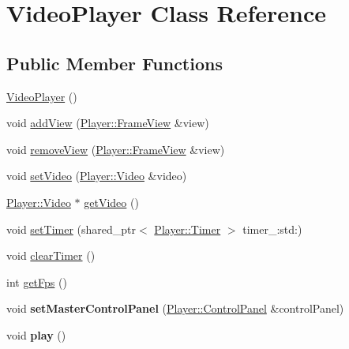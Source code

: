 \hypertarget{classPlayer_1_1VideoPlayer}{}\section{Video\+Player Class Reference}
\label{classPlayer_1_1VideoPlayer}
\subsection*{Public Member Functions}
\begin{DoxyCompactItemize}
\item 
\hyperlink{classPlayer_1_1VideoPlayer_af6d7bb082887f6a9738741778c58daf8}{Video\+Player} ()
\item 
void \hyperlink{classPlayer_1_1VideoPlayer_a320aefdc59942711233d0bd903c7278c}{add\+View} (\hyperlink{classPlayer_1_1FrameView}{Player\+::\+Frame\+View} \&view)
\item 
void \hyperlink{classPlayer_1_1VideoPlayer_aa88692d3a84069234e027353a77ea73f}{remove\+View} (\hyperlink{classPlayer_1_1FrameView}{Player\+::\+Frame\+View} \&view)
\item 
void \hyperlink{classPlayer_1_1VideoPlayer_af2f6c6c3b1e8296440c02b444767838d}{set\+Video} (\hyperlink{classPlayer_1_1Video}{Player\+::\+Video} \&video)
\item 
\hyperlink{classPlayer_1_1Video}{Player\+::\+Video} $\ast$ \hyperlink{classPlayer_1_1VideoPlayer_a0fa3ec34b26df1cd21a350caf5e59da5}{get\+Video} ()
\item 
void \hyperlink{classPlayer_1_1VideoPlayer_a20e230fdff519566411cff7e4ce5c93d}{set\+Timer} (shared\+\_\+ptr$<$ \hyperlink{classPlayer_1_1Timer}{Player\+::\+Timer} $>$ timer\+\_\+\+:std\+:)
\item 
void \hyperlink{classPlayer_1_1VideoPlayer_ac99343fd51cdad1ee430905a00791ade}{clear\+Timer} ()
\item 
int \hyperlink{classPlayer_1_1VideoPlayer_a519ad5c0664b9de28c1a6d9dc77f959d}{get\+Fps} ()
\item 
\hypertarget{classPlayer_1_1VideoPlayer_a10af72f33b5d276133eb59f94c5cfc49}{}void {\bfseries set\+Master\+Control\+Panel} (\hyperlink{classPlayer_1_1ControlPanel}{Player\+::\+Control\+Panel} \&control\+Panel)\label{classPlayer_1_1VideoPlayer_a10af72f33b5d276133eb59f94c5cfc49}

\item 
\hypertarget{classPlayer_1_1VideoPlayer_a6d58098c6cf63c241ed03bc797256bb1}{}void {\bfseries play} ()\label{classPlayer_1_1VideoPlayer_a6d58098c6cf63c241ed03bc797256bb1}


\end{DoxyCompactItemize}
